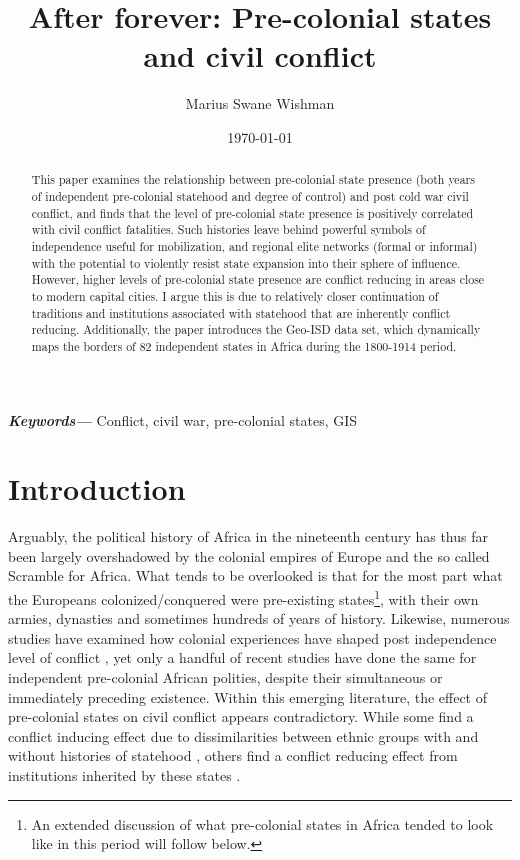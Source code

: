 \documentclass[12pt]{article}
\title{After forever: Pre-colonial states and civil conflict}
\author[1]{Marius Swane Wishman}
\affil[1]{Department of Sociology and Political Science, NTNU}
\date{\today}
\providecommand{\keywords}[1]
{
	\small	
	\textbf{\textit{Keywords---}} #1
}
\begin{document}
\maketitle

\begin{abstract}

This paper examines the relationship between pre-colonial state presence (both
years of independent pre-colonial statehood and degree of control) and post cold
war civil conflict, and finds that the level of pre-colonial state presence is
positively correlated with civil conflict fatalities. Such histories leave
behind powerful symbols of independence useful for mobilization, and regional
elite networks (formal or informal) with the potential to violently resist state
expansion into their sphere of influence. However, higher levels of pre-colonial
state presence are conflict reducing in areas close to modern capital cities. I
argue this is due to relatively closer continuation of traditions and
institutions associated with statehood that are inherently conflict reducing.
Additionally, the paper introduces the Geo-ISD data set, which dynamically maps
the borders of 82 independent states in Africa during the 1800-1914 period. 

\end{abstract}

\keywords{Conflict, civil war, pre-colonial states, GIS}


\onehalfspacing


\newpage

\section{Introduction}

Arguably, the political history of Africa in the nineteenth century has thus far
been largely overshadowed by the colonial empires of Europe and the so called
Scramble for Africa. What tends to be overlooked is that for the most part what
the Europeans colonized/conquered were pre-existing states\footnote{An extended
discussion of what pre-colonial states in Africa tended to look like in this
period will follow below.}, with their own armies, dynasties and sometimes
hundreds of years of history. Likewise, numerous studies have examined how
colonial experiences have shaped post independence level of conflict
\citep{achankeng2013conflict, Blanton_2001, carton2000blood, Cohen_2014,
Nunn2008, Wucherpfennig2016}, yet only a handful of recent studies have done the
same for independent pre-colonial African polities, despite their simultaneous
or immediately preceding existence. Within this emerging literature, the effect
of pre-colonial states on civil conflict appears contradictory. While some find
a conflict inducing effect due to dissimilarities between ethnic groups with and
without histories of statehood \citep{Englebert2002, Paine2019}, others find a
conflict reducing effect from institutions inherited by these states
\citep{Depetris-Chauvin2016, Wig2016}.
\end{document}
